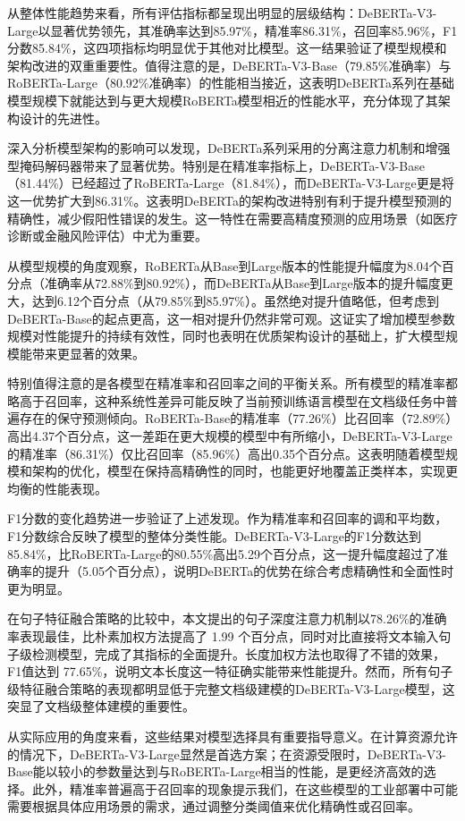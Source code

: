从整体性能趋势来看，所有评估指标都呈现出明显的层级结构：DeBERTa-V3-Large以显著优势领先，其准确率达到85.97\%，精准率86.31\%，召回率85.96\%，F1分数85.84\%，这四项指标均明显优于其他对比模型。这一结果验证了模型规模和架构改进的双重重要性。值得注意的是，DeBERTa-V3-Base（79.85\%准确率）与RoBERTa-Large（80.92\%准确率）的性能相当接近，这表明DeBERTa系列在基础模型规模下就能达到与更大规模RoBERTa模型相近的性能水平，充分体现了其架构设计的先进性。

深入分析模型架构的影响可以发现，DeBERTa系列采用的分离注意力机制和增强型掩码解码器带来了显著优势。特别是在精准率指标上，DeBERTa-V3-Base（81.44\%）已经超过了RoBERTa-Large（81.84\%），而DeBERTa-V3-Large更是将这一优势扩大到86.31\%。这表明DeBERTa的架构改进特别有利于提升模型预测的精确性，减少假阳性错误的发生。这一特性在需要高精度预测的应用场景（如医疗诊断或金融风险评估）中尤为重要。

从模型规模的角度观察，RoBERTa从Base到Large版本的性能提升幅度为8.04个百分点（准确率从72.88\%到80.92\%），而DeBERTa从Base到Large版本的提升幅度更大，达到6.12个百分点（从79.85\%到85.97\%）。虽然绝对提升值略低，但考虑到DeBERTa-Base的起点更高，这一相对提升仍然非常可观。这证实了增加模型参数规模对性能提升的持续有效性，同时也表明在优质架构设计的基础上，扩大模型规模能带来更显著的效果。

特别值得注意的是各模型在精准率和召回率之间的平衡关系。所有模型的精准率都略高于召回率，这种系统性差异可能反映了当前预训练语言模型在文档级任务中普遍存在的保守预测倾向。RoBERTa-Base的精准率（77.26\%）比召回率（72.89\%）高出4.37个百分点，这一差距在更大规模的模型中有所缩小，DeBERTa-V3-Large的精准率（86.31\%）仅比召回率（85.96\%）高出0.35个百分点。这表明随着模型规模和架构的优化，模型在保持高精确性的同时，也能更好地覆盖正类样本，实现更均衡的性能表现。

F1分数的变化趋势进一步验证了上述发现。作为精准率和召回率的调和平均数，F1分数综合反映了模型的整体分类性能。DeBERTa-V3-Large的F1分数达到85.84\%，比RoBERTa-Large的80.55\%高出5.29个百分点，这一提升幅度超过了准确率的提升（5.05个百分点），说明DeBERTa的优势在综合考虑精确性和全面性时更为明显。

在句子特征融合策略的比较中，本文提出的句子深度注意力机制以78.26\%的准确率表现最佳，比朴素加权方法提高了 1.99 个百分点，同时对比直接将文本输入句子级检测模型，完成了其指标的全面提升。长度加权方法也取得了不错的效果，F1值达到 77.65\%，说明文本长度这一特征确实能带来性能提升。然而，所有句子级特征融合策略的表现都明显低于完整文档级建模的DeBERTa-V3-Large模型，这突显了文档级整体建模的重要性。

从实际应用的角度来看，这些结果对模型选择具有重要指导意义。在计算资源允许的情况下，DeBERTa-V3-Large显然是首选方案；在资源受限时，DeBERTa-V3-Base能以较小的参数量达到与RoBERTa-Large相当的性能，是更经济高效的选择。此外，精准率普遍高于召回率的现象提示我们，在这些模型的工业部署中可能需要根据具体应用场景的需求，通过调整分类阈值来优化精确性或召回率。

